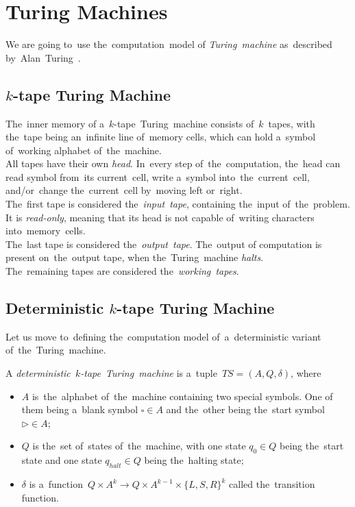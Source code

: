 \section{Turing Machines}
We are going to~use the~computation~model of \textit{Turing~machine} as~described by~Alan~Turing~\cite{Turing}.
\subsection{$k$-tape Turing Machine}
The~inner memory of a~$k$-tape~Turing~machine consists of~$k$~tapes, with the~tape being an~infinite line of~memory cells, which can hold a~symbol of~working alphabet of~the~machine. \\
All tapes have their own \textit{head}. In~every step of~the~computation, the~head can read symbol from~its current~cell, write a~symbol into~the~current~cell, and/or~change the~current~cell by~moving left or~right. \\
The~first tape is considered the~\textit{input~tape}, containing the~input of~the~problem. It is \textit{read-only}, meaning that its head is not capable of~writing characters into~memory~cells. \\
The~last tape is considered the~\textit{output~tape}. The~output of computation is present on~the~output tape, when the~Turing~machine \textit{halts}.\\
The~remaining tapes are considered the~\textit{working~tapes}.
\subsection{Deterministic $k$-tape Turing Machine}
Let us move to~defining the~computation model of~a~deterministic variant of~the~Turing~machine.
\begin{definition}
    A \emph{deterministic~$k$-tape~Turing~machine} is a~tuple~${TS = (A, Q, \delta)}$, where
    \begin{itemize}
        \item $A$ is~the~alphabet of~the~machine containing two special symbols. One of them being a~blank symbol $\square \in A$ and the~other being the~start symbol $\triangleright \in A$;
        \item $Q$ is the~set of~states of~the~machine, with one state $q_0 \in Q$ being the~start state and one state $q_{halt} \in Q$ being the~halting state;
        \item $\delta$ is a~function~${Q \times A^k \rightarrow Q \times A^{k-1} \times \{L, S, R\}^k}$ called the~transition function.
    \end{itemize}
\end{definition}

